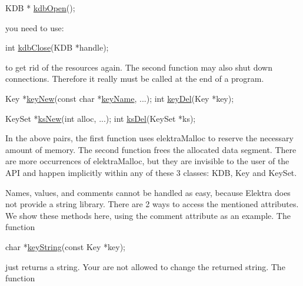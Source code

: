 \begin{DoxyCode}
KDB * \hyperlink{group__kdb_ga6808defe5870f328dd17910aacbdc6ca}{kdbOpen}();
\end{DoxyCode}


you need to use\+:


\begin{DoxyCode}
\textcolor{keywordtype}{int} \hyperlink{group__kdb_gadb54dc9fda17ee07deb9444df745c96f}{kdbClose}(KDB *handle);
\end{DoxyCode}


to get rid of the resources again. The second function may also shut down connections. Therefore it really must be called at the end of a program.


\begin{DoxyCode}
Key *\hyperlink{group__key_gad23c65b44bf48d773759e1f9a4d43b89}{keyNew}(\textcolor{keyword}{const} \textcolor{keywordtype}{char} *\hyperlink{group__keyname_ga8e805c726a60da921d3736cda7813513}{keyName}, ...);
\textcolor{keywordtype}{int} \hyperlink{group__key_ga3df95bbc2494e3e6703ece5639be5bb1}{keyDel}(Key *key);

KeySet *\hyperlink{group__keyset_ga671e1aaee3ae9dc13b4834a4ddbd2c3c}{ksNew}(\textcolor{keywordtype}{int} alloc, ...);
\textcolor{keywordtype}{int} \hyperlink{group__keyset_ga27e5c16473b02a422238c8d970db7ac8}{ksDel}(KeySet *ks);
\end{DoxyCode}


In the above pairs, the first function uses {\ttfamily elektra\+Malloc} to reserve the necessary amount of memory. The second function frees the allocated data segment. There are more occurrences of {\ttfamily elektra\+Malloc}, but they are invisible to the user of the A\+PI and happen implicitly within any of these 3 classes\+: {\ttfamily K\+DB}, {\ttfamily Key} and {\ttfamily Key\+Set}.

Names, values, and comments cannot be handled as easy, because Elektra does not provide a string library. There are 2 ways to access the mentioned attributes. We show these methods here, using the comment attribute as an example. The function


\begin{DoxyCode}
\textcolor{keywordtype}{char} *\hyperlink{group__keyvalue_ga880936f2481d28e6e2acbe7486a21d05}{keyString}(\textcolor{keyword}{const} Key *key);
\end{DoxyCode}


just returns a string. Your are not allowed to change the returned string. The function


